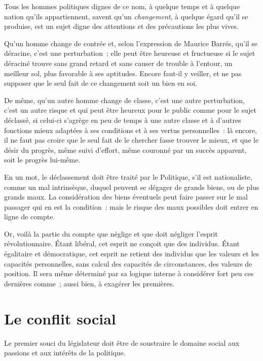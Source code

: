 \documentclass[french,twoside]{book} %
\newcommand{\astermono}{\medskip\centerline{\color{rubric}\large\selectfont{\syms ✻}}\medskip\par}%
\begin{document}
\noindent Tous les hommes politiques dignes de ce nom, à quelque temps et à quelque nation qu’ils appartiennent, savent qu’un \emph{changement}, à quelque égard qu’il se produise, est un sujet digne des attentions et des précautions les plus vives.\par
Qu’un homme change de contrée et, selon l’expression de Maurice Barrés, qu’il se déracine, c’est une perturbation ; elle peut être heureuse et fructueuse si le sujet déraciné trouve sans grand retard et sans causer de trouble à l’entour, un meilleur sol, plus favorable à ses aptitudes. Encore faut-il y veiller, et ne pas supposer que le seul fait de ce changement soit un bien en soi.\par
De même, qu’un autre homme change de classe, c’est une autre perturbation, c’est un autre risque et qui peut être heureux pour le public comme pour le sujet déclassé, si celui-ci s’agrège en peu de temps à une autre classe et à d’autres fonctions mieux adaptées à ses conditions et à ses vertus personnelles : là encore, il ne faut pas croire que le seul fait de le chercher fasse trouver le mieux, et que le désir du progrès, même suivi d’effort, même couronné par un succès apparent, soit le progrès lui-même.\par
En un mot, le déclassement doit être traité par le Politique, s’il est nationaliste, comme un mal intrinsèque, duquel peuvent se dégager de grands biens, ou de plus grands maux. La considération des biens éventuels peut faire passer sur le mal passager qui en est la condition : mais le risque des maux possibles doit entrer en ligne de compte.\par

\astermono

\noindent Or, voilà la partie du compte que néglige et que doit négliger l’esprit révolutionnaire. Étant libéral, cet esprit ne conçoit que des individus. Étant égalitaire et démocratique, cet esprit ne retient des individus que les valeurs et les capacités personnelles, sans calcul des capacités de circonstances, des valeurs de position. Il sera même déterminé par sa logique interne à considérer fort peu ces dernières comme ; aussi bien, à exagérer les premières.
\section[Le conflit social]{Le conflit social}
\noindent Le premier souci du législateur doit être de soustraire le domaine social aux passions et aux intérêts de la politique.\par
\end{document}
